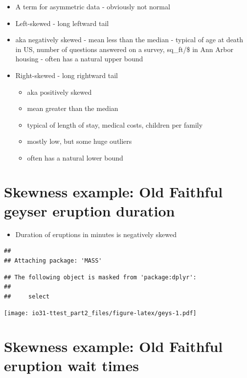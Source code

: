 \documentclass[
]{book}
\providecommand{\tightlist}{%
  \setlength{\itemsep}{0pt}\setlength{\parskip}{0pt}}
\begin{document}
\begin{itemize}
\tightlist
\item
  A term for asymmetric data - obviously not normal
\item
  Left-skewed - long leftward tail
\item
  aka negatively skewed
  - mean less than the median
  - typical of age at death in US, number of questions answered on a survey, sq\_ft/\$ in Ann Arbor housing
  - often has a natural upper bound
\item
  Right-skewed - long rightward tail

  \begin{itemize}
  \tightlist
  \item
    aka positively skewed
  \item
    mean greater than the median
  \item
    typical of length of stay, medical costs, children per family
  \item
    mostly low, but some huge outliers
  \item
    often has a natural lower bound
  \end{itemize}
\end{itemize}

\hypertarget{skewness-example-old-faithful-geyser-eruption-duration}{%
\section{Skewness example: Old Faithful geyser eruption duration}\label{skewness-example-old-faithful-geyser-eruption-duration}}

\begin{itemize}
\tightlist
\item
  Duration of eruptions in minutes is negatively skewed
\end{itemize}

\begin{verbatim}
## 
## Attaching package: 'MASS'
\end{verbatim}

\begin{verbatim}
## The following object is masked from 'package:dplyr':
## 
##     select
\end{verbatim}

\texttt{[image: io31-ttest\_part2\_files/figure-latex/geys-1.pdf]}

\hypertarget{skewness-example-old-faithful-eruption-wait-times}{%
\section{Skewness example: Old Faithful eruption wait times}\label{skewness-example-old-faithful-eruption-wait-times}}
\end{document}
